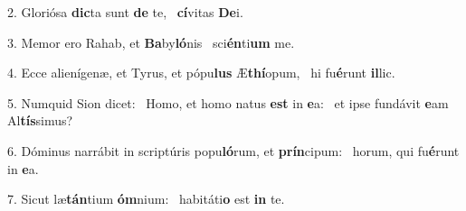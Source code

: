 2. Gloriósa \textbf{dic}ta sunt \textbf{de} te, \ast\  \textbf{cí}vitas \textbf{De}i.\

3. Memor ero Rahab, et \textbf{Ba}by\textbf{ló}nis \ast\  sci\textbf{én}ti\textbf{um} me.\

4. Ecce alienígenæ, et Tyrus, et pópu\textbf{lus} Æ\textbf{thí}opum, \ast\  hi fu\textbf{é}runt \textbf{il}lic.\

5. Numquid Sion dicet: \dag\  Homo, et homo natus \textbf{est} in \textbf{e}a: \ast\  et ipse fundávit \textbf{e}am Al\textbf{tís}simus?\

6. Dóminus narrábit in scriptúris popu\textbf{ló}rum, et \textbf{prín}cipum: \ast\  horum, qui fu\textbf{é}runt in \textbf{e}a.\

7. Sicut læ\textbf{tán}tium \textbf{óm}nium: \ast\  habitáti\textbf{o} est \textbf{in} te.\

